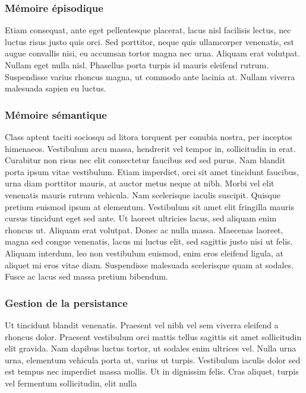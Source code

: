\subsubsection{Mémoire épisodique}

Etiam consequat, ante eget pellentesque placerat, lacus nisl facilisis lectus, nec luctus risus justo quis orci. Sed porttitor, neque quis ullamcorper venenatis, est augue convallis nisi, eu accumsan tortor magna nec urna. Aliquam erat volutpat. Nullam eget nulla nisl. Phasellus porta turpis id mauris eleifend rutrum. Suspendisse varius rhoncus magna, ut commodo ante lacinia at. Nullam viverra malesuada sapien eu luctus. 

\subsubsection{Mémoire sémantique}

Class aptent taciti sociosqu ad litora torquent per conubia nostra, per inceptos himenaeos. Vestibulum arcu massa, hendrerit vel tempor in, sollicitudin in erat. Curabitur non risus nec elit consectetur faucibus sed sed purus. Nam blandit porta ipsum vitae vestibulum. Etiam imperdiet, orci sit amet tincidunt faucibus, urna diam porttitor mauris, at auctor metus neque at nibh. Morbi vel elit venenatis mauris rutrum vehicula. Nam scelerisque iaculis suscipit. Quisque pretium euismod ipsum at elementum. Vestibulum sit amet elit fringilla mauris cursus tincidunt eget sed ante. Ut laoreet ultricies lacus, sed aliquam enim rhoncus ut. Aliquam erat volutpat. Donec ac nulla massa. Maecenas laoreet, magna sed congue venenatis, lacus mi luctus elit, sed sagittis justo nisi ut felis. Aliquam interdum, leo non vestibulum euismod, enim eros eleifend ligula, at aliquet mi eros vitae diam. Suspendisse malesuada scelerisque quam at sodales. Fusce ac lacus sed massa pretium bibendum. 

\subsubsection{Gestion de la persistance}

Ut tincidunt blandit venenatis. Praesent vel nibh vel sem viverra eleifend a rhoncus dolor. Praesent vestibulum orci mattis tellus sagittis sit amet sollicitudin elit gravida. Nam dapibus luctus tortor, ut sodales enim ultrices vel. Nulla urna urna, elementum vehicula porta ut, varius ut turpis. Vestibulum iaculis dolor sed est tempus nec imperdiet massa mollis. Ut in dignissim felis. Cras aliquet, turpis vel fermentum sollicitudin, elit
nulla

